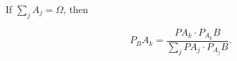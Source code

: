 If $\sum_j A_j = \Omega$, then

$$P_B A_k = \frac{PA_k \cdot P_{A_k} B}{\sum_j PA_j \cdot P_{A_j} B}.$$
